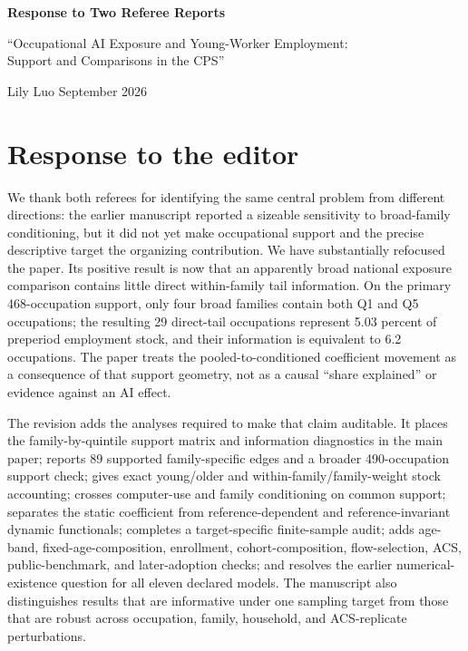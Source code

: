 \documentclass[11pt,letterpaper]{article}
\begin{document}
\begin{center}
{\Large\bfseries Response to Two Referee Reports}\par
\vspace{0.35em}
{\large ``Occupational AI Exposure and Young-Worker Employment:\\
Support and Comparisons in the CPS''}\par
\vspace{0.35em}
Lily Luo \quad September 2026
\end{center}

\section*{Response to the editor}

We thank both referees for identifying the same central problem from different directions: the earlier manuscript reported a sizeable sensitivity to broad-family conditioning, but it did not yet make occupational support and the precise descriptive target the organizing contribution.  We have substantially refocused the paper.  Its positive result is now that an apparently broad national exposure comparison contains little direct within-family tail information.  On the primary 468-occupation support, only four broad families contain both Q1 and Q5 occupations; the resulting 29 direct-tail occupations represent 5.03 percent of preperiod employment stock, and their information is equivalent to 6.2 occupations.  The paper treats the pooled-to-conditioned coefficient movement as a consequence of that support geometry, not as a causal ``share explained'' or evidence against an AI effect.

The revision adds the analyses required to make that claim auditable.  It places the family-by-quintile support matrix and information diagnostics in the main paper; reports 89 supported family-specific edges and a broader 490-occupation support check; gives exact young/older and within-family/family-weight stock accounting; crosses computer-use and family conditioning on common support; separates the static coefficient from reference-dependent and reference-invariant dynamic functionals; completes a target-specific finite-sample audit; adds age-band, fixed-age-composition, enrollment, cohort-composition, flow-selection, ACS, public-benchmark, and later-adoption checks; and resolves the earlier numerical-existence question for all eleven declared models.  The manuscript also distinguishes results that are informative under one sampling target from those that are robust across occupation, family, household, and ACS-replicate perturbations.
\end{document}
